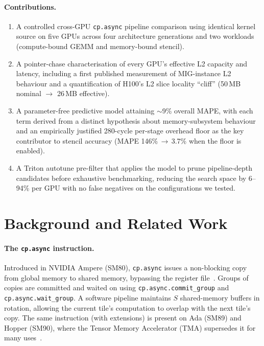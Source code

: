 \documentclass[10pt,twocolumn]{article}
\newcommand{\cpasync}{\texttt{cp.async}}
\begin{document}
\paragraph{Contributions.}
\begin{enumerate}
\item A controlled cross-GPU \cpasync{} pipeline comparison using
  identical kernel source on five GPUs across four architecture
  generations and two workloads (compute-bound GEMM and memory-bound
  stencil).
\item A pointer-chase characterisation of every GPU's effective L2
  capacity and latency, including a first published measurement of
  MIG-instance L2 behaviour and a quantification of H100's L2 slice
  locality ``cliff'' (50\,MB nominal $\to$ 26\,MB effective).
\item A parameter-free predictive model attaining
  $\sim$9\% overall MAPE, with each term derived from a distinct
  hypothesis about memory-subsystem behaviour and an empirically
  justified 280-cycle per-stage overhead floor as the key
  contributor to stencil accuracy (MAPE 146\%\,$\to$\,3.7\% when the
  floor is enabled).
\item A Triton autotune pre-filter that applies the model to prune
  pipeline-depth candidates before exhaustive benchmarking, reducing
  the search space by 6--94\% per GPU with no false negatives on the
  configurations we tested.
\end{enumerate}

\section{Background and Related Work}
\label{sec:related}

\paragraph{The \cpasync{} instruction.}
Introduced in NVIDIA Ampere (SM80), \cpasync{} issues a
non-blocking copy from global memory to shared memory, bypassing
the register file~\cite{cuda_guide}.  Groups of copies are committed
and waited on using \texttt{cp.async.commit\_group} and
\texttt{cp.async.wait\_group}.  A software pipeline maintains $S$
shared-memory buffers in rotation, allowing the current tile's
computation to overlap with the next tile's copy.  The same
instruction (with extensions) is present on Ada (SM89) and Hopper
(SM90), where the Tensor Memory Accelerator (TMA)
supersedes it for many uses~\cite{hopper_ieee,hopper_microbench}.
\end{document}
